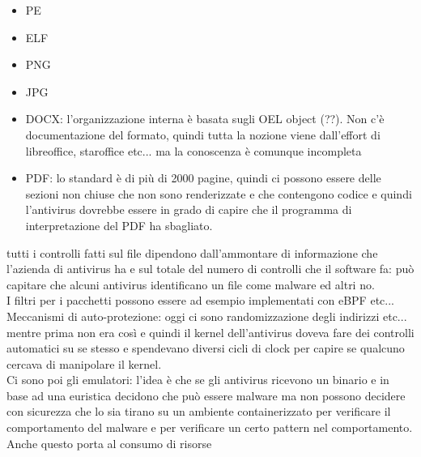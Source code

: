 \documentclass[12pt, oneside]{extbook} %
\begin{document}
\begin{itemize}
\item PE
\item ELF
\item PNG
\item JPG
\item DOCX: l'organizzazione interna è basata sugli OEL object (??). Non c'è documentazione del formato, quindi tutta la nozione viene dall'effort di libreoffice, staroffice etc... ma la conoscenza è comunque incompleta
\item PDF: lo standard è di più di 2000 pagine, quindi ci possono essere delle sezioni non chiuse che non sono renderizzate e che contengono codice e quindi l'antivirus dovrebbe essere in grado di capire che il programma di interpretazione del PDF ha sbagliato.
\end{itemize}
tutti i controlli fatti sul file dipendono dall'ammontare di informazione che l'azienda di antivirus ha e sul totale del numero di controlli che il software fa: può capitare che alcuni antivirus identificano un file come malware ed altri no.\\I filtri per i pacchetti possono essere ad esempio implementati con eBPF etc...\\Meccanismi di auto-protezione: oggi ci sono randomizzazione degli indirizzi etc... mentre prima non era così e quindi il kernel dell'antivirus doveva fare dei controlli automatici su se stesso e spendevano diversi cicli di clock per capire se qualcuno cercava di manipolare il kernel.\\Ci sono poi gli emulatori: l'idea è che se gli antivirus ricevono un binario e in base ad una euristica decidono che può essere malware ma non possono decidere con sicurezza che lo sia tirano su un ambiente containerizzato per verificare il comportamento del malware e per verificare un certo pattern nel comportamento. Anche questo porta al consumo di risorse
\end{document}
